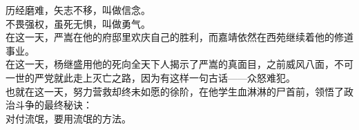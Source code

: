 \begin{multicols}{\theparacolNo}
历经磨难，矢志不移，叫做信念。\\

不畏强权，虽死无惧，叫做勇气。\\

在这一天，严嵩在他的府邸里欢庆自己的胜利，而嘉靖依然在西苑继续着他的修道事业。\\

在这一天，杨继盛用他的死向全天下人揭示了严嵩的真面目，之前威风八面，不可一世的严党就此走上灭亡之路，因为有这样一句古话——众怒难犯。\\

也就在这一天，努力营救却终未如愿的徐阶，在他学生血淋淋的尸首前，领悟了政治斗争的最终秘诀：\\

对付流氓，要用流氓的方法。\\
\ifnum{}
	\end{multicols}
\fi
\newpage
